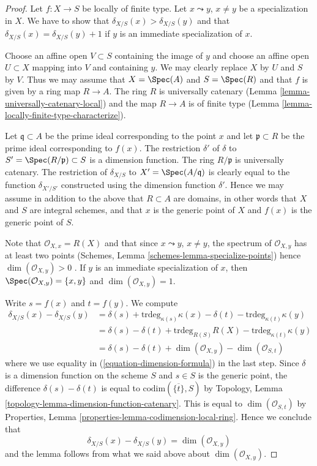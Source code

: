 \begin{proof}
Let $f : X \to S$ be locally of finite type.
Let $x \leadsto y$, $x \not = y$ be a specialization in $X$.
We have to show that $\delta_{X/S}(x) > \delta_{X/S}(y)$ and
that $\delta_{X/S}(x) = \delta_{X/S}(y) + 1$ if $y$ is an
immediate specialization of $x$.

\medskip\noindent
Choose an affine open $V \subset S$ containing the image of
$y$ and choose an affine open $U \subset X$ mapping into $V$
and containing $y$. We may clearly replace $X$ by $U$ and
$S$ by $V$. Thus we may assume that $X = \Spec(A)$
and $S = \Spec(R)$ and that $f$ is given by a ring
map $R \to A$. The ring $R$ is universally catenary
(Lemma \ref{lemma-universally-catenary-local})
and the map $R \to A$ is of finite type
(Lemma \ref{lemma-locally-finite-type-characterize}).

\medskip\noindent
Let $\mathfrak q \subset A$ be the prime ideal corresponding
to the point $x$ and let $\mathfrak p \subset R$ be the prime
ideal corresponding to $f(x)$. The restriction $\delta'$ of $\delta$
to $S' = \Spec(R/\mathfrak p) \subset S$ is a dimension
function. The ring $R/\mathfrak p$ is universally catenary.
The restriction of $\delta_{X/S}$ to $X' = \Spec(A/\mathfrak q)$
is clearly equal to the function $\delta_{X'/S'}$ constructed
using the dimension function $\delta'$. Hence we may assume
in addition to the above that $R \subset A$ are domains, in
other words that $X$ and $S$ are integral schemes, and that
$x$ is the generic point of $X$ and $f(x)$ is the generic point of $S$.

\medskip\noindent
Note that $\mathcal{O}_{X, x} = R(X)$ and that since $x \leadsto y$,
$x \not = y$, the spectrum of $\mathcal{O}_{X, y}$ has at least
two points
(Schemes, Lemma \ref{schemes-lemma-specialize-points})
hence $\dim(\mathcal{O}_{X, y}) > 0$ .
If $y$ is an immediate specialization of $x$, then
$\Spec(\mathcal{O}_{X, y}) = \{x, y\}$ and
$\dim(\mathcal{O}_{X, y}) = 1$.

\medskip\noindent
Write $s = f(x)$ and $t = f(y)$. We compute
\begin{align*}
\delta_{X/S}(x) - \delta_{X/S}(y)
& =
\delta(s) + \text{trdeg}_{\kappa(s)} \kappa(x)
- \delta(t) - \text{trdeg}_{\kappa(t)} \kappa(y) \\
& =
\delta(s) - \delta(t) +
\text{trdeg}_{R(S)} R(X) - \text{trdeg}_{\kappa(t)} \kappa(y) \\
& =
\delta(s) - \delta(t) + \dim(\mathcal{O}_{X, y})
- \dim(\mathcal{O}_{S, t})
\end{align*}
where we use equality in (\ref{equation-dimension-formula}) in
the last step. Since $\delta$ is a dimension function on the scheme $S$
and $s \in S$ is the generic point, the difference
$\delta(s) - \delta(t)$ is equal to $\text{codim}(\overline{\{t\}}, S)$ by
Topology, Lemma \ref{topology-lemma-dimension-function-catenary}.
This is equal to $\dim(\mathcal{O}_{S, t})$ by
Properties, Lemma
\ref{properties-lemma-codimension-local-ring}.
Hence we conclude that
$$
\delta_{X/S}(x) - \delta_{X/S}(y) = \dim(\mathcal{O}_{X, y})
$$
and the lemma follows from what we said above about $\dim(\mathcal{O}_{X, y})$.
\end{proof}

